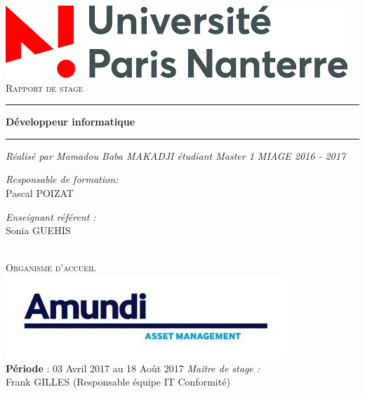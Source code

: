 \documentclass[12pt,a4paper]{report}
\begin{document}
\begin{titlepage}
\begin{center}
\includegraphics[scale=0.5]{IMG/upx.png} \vspace{2cm} 
\newline
\textsc{\Large Rapport de stage}\\[0.5cm] 
\hrule 
{\huge \vspace{0.4cm}\bfseries Développeur informatique\par}\vspace{0.4cm}
\hrule 
\vspace{0.6cm}\emph{Réalisé par Mamadou Baba MAKADJI \newline étudiant Master 1 MIAGE 2016 - 2017}\vspace{2cm}
\newline
\begin{minipage}[t]{0.4\textwidth}
\begin{flushleft} \large
\emph{Responsable de formation:} \\ Pascal POIZAT
\end{flushleft}
\end{minipage}
\begin{minipage}[t]{0.4\textwidth}
\begin{flushright} \large
\emph{Enseignant référent :} \\ Sonia GUEHIS
\end{flushright}
\end{minipage}\\[2cm]
\textsc{\Large Organisme d'accueil}\\[0.5cm] 
\includegraphics[scale=0.5]{IMG/amundi.jpg} \\[0.5cm]
\textbf{Période} : 03 Avril 2017 au 18 Août 2017 \vspace{0.4cm}
\newline
\emph{Maître de stage :} \\ Frank GILLES \vspace{0.3cm}
(Responsable équipe IT Conformité)
\end{center}
\end{titlepage}
\end{document}
